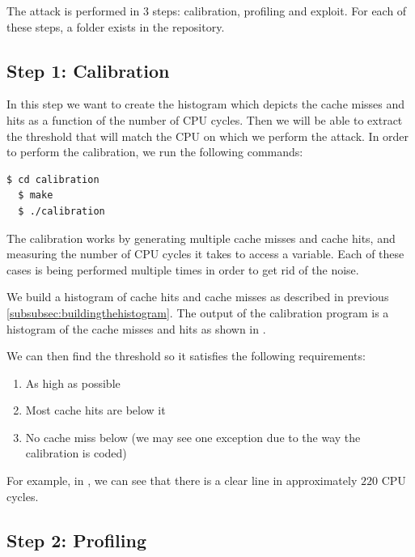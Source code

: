 The attack is performed in 3 steps: calibration, profiling and exploit. For each
of these steps, a folder exists in the repository.

\subsection{Step 1: Calibration}
\label{subsec:step1calibration}

In this step we want to create the histogram which depicts the cache misses and
hits as a function of the number of CPU cycles. Then we will be able to extract
the threshold that will match the CPU on which we perform the attack. In order
to perform the calibration, we run the following commands:

\begin{lstlisting}[language=bash]
  $ cd calibration
  $ make
  $ ./calibration
\end{lstlisting}

The calibration works by generating multiple cache misses and cache hits, and
measuring the number of CPU cycles it takes to access a variable. Each of these
cases is being performed multiple times in order to get rid of the noise.

\noindent We build a histogram of cache hits and cache misses as described in
previous \cref{subsubsec:buildingthehistogram}. The output of the calibration
program is a histogram of the cache misses and hits as shown in
.

We can then find the threshold so it satisfies the following requirements:
\begin{enumerate}
    \item As high as possible
    \item Most cache hits are below it
    \item No cache miss below (we may see one exception due to the way the
    calibration is coded)
\end{enumerate}

For example, in , we can see that there is a
clear line in approximately $220$ CPU cycles.

\subsection{Step 2: Profiling}
\label{subsec:step2profiling}

